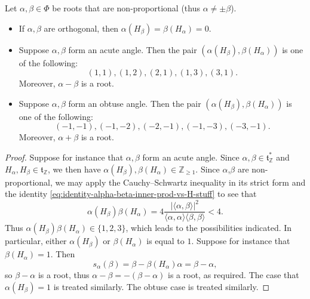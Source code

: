 \documentclass[reqno]{amsart} 
\begin{document}
\begin{lemma}\label{lem:non-proportional-roots-inner-products-etc}
  Let $\alpha,\beta \in \Phi$ be roots that are non-proportional (thus $\alpha \neq \pm \beta$).
  \begin{itemize}
  \item If $\alpha,\beta$ are orthogonal, then $\alpha(H_\beta) = \beta(H_\alpha) = 0$.
  \item Suppose $\alpha,\beta$ form an acute angle.  Then the pair $(\alpha(H_\beta), \beta(H_\alpha))$ is one of the following:
    \begin{equation*}
      (1,1), (1,2), (2, 1), (1, 3), (3, 1).
    \end{equation*}
    Moreover, $\alpha - \beta$ is a root.
  \item Suppose $\alpha,\beta$ form an obtuse angle.  Then the pair $(\alpha(H_\beta), \beta(H_\alpha))$ is one of the following:
    \begin{equation*}
      (-1,-1), (-1,-2), (-2, -1), (-1, -3), (-3, -1).
    \end{equation*}
    Moreover, $\alpha + \beta$ is a root.
  \end{itemize}
\end{lemma}
\begin{proof}
  Suppose for instance that $\alpha,\beta$ form an acute angle.  Since $\alpha,\beta \in \mathfrak{t}_{\mathbb{Z}}^*$ and $H_\alpha, H_\beta \in \mathfrak{t}_{\mathbb{Z}}$, we then have $\alpha(H_\beta), \beta(H_\alpha) \in \mathbb{Z}_{\geq 1}$.  Since $\alpha$,$\beta$ are non-proportional, we may apply the Cauchy--Schwartz inequality in its strict form and the identity \eqref{eq:identity-alpha-beta-inner-prod-vs-H-stuff} to see that
  \begin{equation*}
    \alpha(H_\beta) \beta(H_\alpha) = 4 \frac { \left\lvert \langle \alpha, \beta \rangle \right\rvert^2 } { \langle \alpha, \alpha \rangle \langle \beta, \beta \rangle } < 4.
  \end{equation*}
  Thus $\alpha(H_\beta) \beta(H_\alpha) \in \{1,2,3\}$, which leads to the possibilities indicated.  In particular, either $\alpha(H_\beta)$ or $\beta(H_\alpha)$ is equal to $1$.  Suppose for instance that $\beta(H_\alpha) = 1$.  Then
  \begin{equation*}
    s_{\alpha}(\beta) = \beta - \beta(H_\alpha) \alpha = \beta - \alpha,
  \end{equation*}
  so $\beta - \alpha$ is a root, thus $\alpha - \beta = - (\beta - \alpha)$ is a root, as required.  The case that $\alpha(H_\beta) = 1$ is treated similarly.  The obtuse case is treated similarly.
\end{proof}
\end{document}
